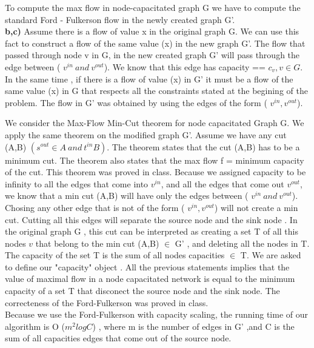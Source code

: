 \documentclass[11 pt]{article}
\begin{document}
To compute the max flow in node-capacitated graph G we have to compute the standard Ford - Fulkerson flow in the newly created graph G'.\\

\textbf{b,c)}
Assume there is a flow of value x in the original graph G. We can use this fact to construct a flow of the same value (x) in the new graph G'. The flow that passed through node v in G, in the new created graph G' will pass through the edge between  ( $v^{in} \ and \  v^{out}$). We know that this edge has capacity == $c_v , v \in G$. In the same time , if there is a flow of value (x) in G' it must be a flow of the same value (x) in G that respects all the constraints stated at the begining of the problem. The flow in G' was obtained by using the edges of the form ( $v^{in} , v^{out}$).

We consider the Max-Flow  Min-Cut theorem for node capacitated Graph G. We apply the same theorem on the modified graph G'. Assume we have any cut (A,B) $(s^{out} \in A \ and \ t^{in} B)$. The theorem states that the cut (A,B) has to be a minimum cut. The theorem also states that the max flow f = minimum capacity of the cut. This theorem was proved in class. Because we assigned capacity to be infinity to all the edges that come into $v^{in}$, and all the edges that come out $v^{out}$, we know that a min cut (A,B) will have only the edges between  ( $v^{in} \ and \  v^{out}$). Chosing any other edge that is not of the form ( $v^{in} , v^{out}$) will not create a min cut. Cutting all this edges will separate the source node and the sink node . In the original graph G , this cut can be interpreted as creating a set T of all this nodes $v$  that belong to the min cut (A,B) $\in$ G' , and deleting all the nodes in T. The capacity of the set T is the sum of all nodes capacities $\in$ T.  We are asked to define our "capacity" object . All the previous statements implies that the  value of maximal flow in a node capacitated network 
is equal to the minimum capacity of a set T that disconect the source node and the sink node. The correcteness of the Ford-Fulkerson was proved in class. \\

Because we use the Ford-Fulkerson with capacity scaling, the running time of our algorithm is O ($m^2 log C$) , where m is the number of edges in G' ,and C is the sum of all capacities edges that come out of the source node. 
\end{document}
